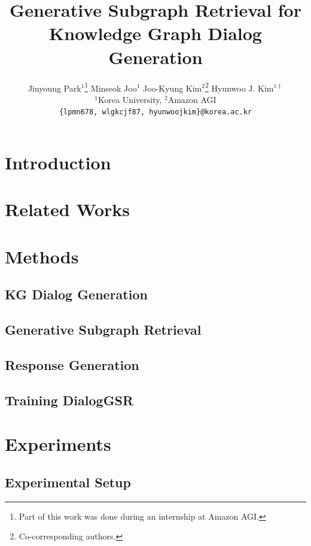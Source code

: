 \documentclass[11pt]{article}
\title{Generative Subgraph Retrieval for \\Knowledge Graph\textendash{Grounded} Dialog Generation}
\author{Jinyoung Park$^1$\thanks{Part of this work was done during an internship at Amazon AGI.} \quad Minseok Joo$^1$ \quad Joo-Kyung Kim$^2$\thanks{Co-corresponding authors.} \quad Hyunwoo J. Kim$^{1\dagger}$ \\
        $^1$Korea University,  $^2$Amazon AGI\\
        {\tt \{lpmn678, wlgkcjf87, hyunwoojkim\}@korea.ac.kr} \quad {\tt jookyk@amazon.com}\\}
\begin{document}

\maketitle
\begin{abstract}

\end{abstract}

\section{Introduction}


\section{Related Works}


\section{Methods}

\subsection{KG Dialog Generation}
\label{sec:3.1}

\subsection{Generative Subgraph Retrieval}

\subsection{Response Generation}

\subsection{Training DialogGSR}
\label{sec:3.4}
\label{sec:method_training}


\section{Experiments}
\label{sec:exp}

\subsection{Experimental Setup}

\end{document}
